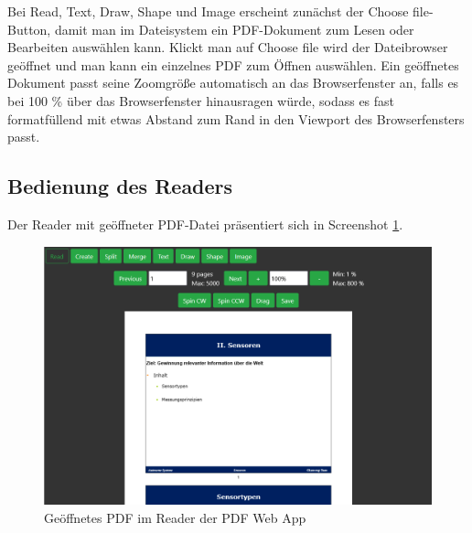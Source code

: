 Bei Read, Text, Draw, Shape und Image erscheint zunächst der Choose file-Button, damit man im Dateisystem ein PDF-Dokument zum Lesen oder Bearbeiten auswählen kann. Klickt man auf Choose file wird der Dateibrowser geöffnet und man kann ein einzelnes PDF zum Öffnen auswählen. Ein geöffnetes Dokument passt seine Zoomgröße automatisch an das Browserfenster an, falls es bei 100 \% über das Browserfenster hinausragen würde, sodass es fast formatfüllend mit etwas Abstand zum Rand in den Viewport des Browserfensters passt. 

\subsection{Bedienung des Readers}
Der Reader mit geöffneter PDF-Datei präsentiert sich in Screenshot \ref{fig:reader}.

\begin{figure}[!htbp]
	\centering
	\includegraphics[width=1\textwidth]{"images/reader.png"}
	\caption{Geöffnetes PDF im Reader der PDF Web App}
	\label{fig:reader}
\end{figure}

